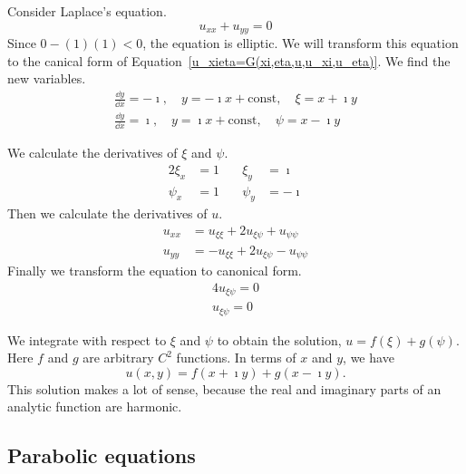 \begin{Example}
  Consider Laplace's equation.
  \[
  u_{x x} + u_{y y} = 0
  \]
  Since $0 - (1)(1) < 0$, the equation is elliptic.
  We will transform this equation to the canical form of 
  Equation~\ref{u_xieta=G(xi,eta,u,u_xi,u_eta)}.
  We find the new variables.
  \begin{gather*}
    \frac{\dd y}{\dd x} = - \imath, \quad 
    y = - \imath x + \mathrm{const}, \quad
    \xi = x + \imath y 
    \\
    \frac{\dd y}{\dd x} = \imath, \quad 
    y = \imath x + \mathrm{const}, \quad
    \psi = x - \imath y
  \end{gather*}

  We calculate the derivatives of $\xi$ and $\psi$.
  \begin{alignat*}{2}
    \xi_x &= 1 &\quad \xi_y &= \imath 
    \\
    \psi_x &= 1 &\quad \psi_y &= -\imath 
  \end{alignat*}
  Then we calculate the derivatives of $u$.
  \begin{align*}
    u_{x x} &= u_{\xi \xi} + 2 u_{\xi \psi} + u_{\psi \psi} 
    \\
    u_{y y} &= - u_{\xi \xi} + 2 u_{\xi \psi} - u_{\psi \psi}
  \end{align*}
  Finally we transform the equation to canonical form.
  \begin{gather*}
    4 u_{\xi \psi} = 0 
    \\
    \boxed{
      u_{\xi \psi} = 0
      }
  \end{gather*}

  We integrate with respect to $\xi$ and $\psi$ to obtain the 
  solution, $u = f(\xi) + g(\psi)$.  Here $f$ and $g$ are arbitrary
  $C^2$ functions.  In terms of $x$ and $y$, we have
  \[
  \boxed{
    u(x,y) = f(x + \imath y) + g(x - \imath y).
    }
  \]
  This solution makes a lot of sense, because the real and imaginary
  parts of an analytic function are harmonic.
\end{Example}









\subsection{Parabolic equations}


